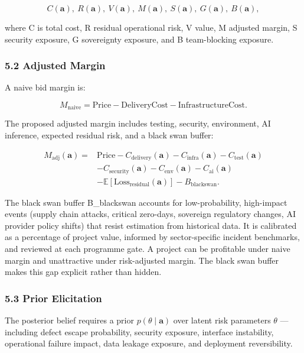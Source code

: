 \documentclass[
]{article}
\begin{document}
\[C(\mathbf{a}),\ R(\mathbf{a}),\ V(\mathbf{a}),\ M(\mathbf{a}),\ S(\mathbf{a}),\ G(\mathbf{a}),\ B(\mathbf{a}),\]

where C is total cost, R residual operational risk, V value, M adjusted
margin, S security exposure, G sovereignty exposure, and B team-blocking
exposure.

\subsubsection{5.2 Adjusted Margin}\label{adjusted-margin}

A naive bid margin is:

\[M_{\mathrm{naive}} = \mathrm{Price} - \mathrm{DeliveryCost} - \mathrm{InfrastructureCost}.\]

The proposed adjusted margin includes testing, security, environment, AI
inference, expected residual risk, and a black swan buffer:

\[\begin{aligned}
M_{\mathrm{adj}}(\mathbf{a}) ={}& \mathrm{Price} - C_{\mathrm{delivery}}(\mathbf{a}) - C_{\mathrm{infra}}(\mathbf{a}) - C_{\mathrm{test}}(\mathbf{a}) \\
& - C_{\mathrm{security}}(\mathbf{a}) - C_{\mathrm{env}}(\mathbf{a}) - C_{\mathrm{ai}}(\mathbf{a}) \\
& - \mathbb{E}[\mathrm{Loss}_{\mathrm{residual}}(\mathbf{a})] - B_{\mathrm{blackswan}}.
\end{aligned}\]

The black swan buffer B\_blackswan accounts for low-probability,
high-impact events (supply chain attacks, critical zero-days, sovereign
regulatory changes, AI provider policy shifts) that resist estimation
from historical data. It is calibrated as a percentage of project value,
informed by sector-specific incident benchmarks, and reviewed at each
programme gate. A project can be profitable under naive margin and
unattractive under risk-adjusted margin. The black swan buffer makes
this gap explicit rather than hidden.

\subsubsection{5.3 Prior Elicitation}\label{prior-elicitation}

The posterior belief requires a prior \(p(\theta \mid \mathbf{a})\) over
latent risk parameters \(\theta\) --- including defect escape
probability, security exposure, interface instability, operational
failure impact, data leakage exposure, and deployment reversibility.
\end{document}

